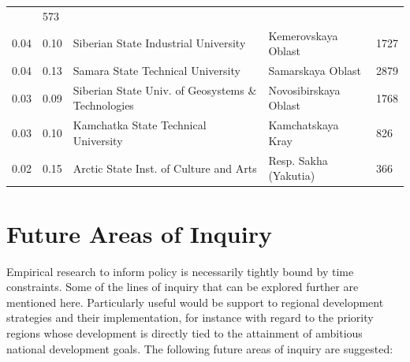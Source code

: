 \documentclass[alpha-refs]{wiley-article-04t}
\begin{document}
\begin{table}[htbp!]
\begin{tabular}{|p{.75cm}|p{.75cm}|p{7cm}|p{3cm}|R{1.25cm}|}
		& 573 \\ 
		0.04 & 0.10 & Siberian State Industrial University & Kemerovskaya 
		Oblast & 1727 \\ 
		0.04 & 0.13 & Samara State Technical University & Samarskaya Oblast 
		& 2879 \\ 
		0.03 & 0.09 & Siberian State Univ. of Geosystems \& Technologies & 
		Novosibirskaya Oblast & 1768 \\ 
		0.03 & 0.10 & Kamchatka State Technical University & Kamchatskaya 
		Kray & 826 \\ 
		0.02 & 0.15 & Arctic State Inst. of Culture and Arts & Resp. Sakha 
		(Yakutia) & 366 \\ 
		\hline
	\end{tabular}
\end{table}



\newpage

\section{Future Areas of Inquiry}



Empirical research to inform policy is necessarily tightly bound by time 
constraints. Some of the lines of inquiry that can be explored further are 
mentioned here. Particularly useful would be support to regional 
development strategies and their implementation, for instance with regard 
to the priority regions whose development is directly tied to the 
attainment of ambitious national development goals. The following future 
areas of inquiry are suggested:
\end{document}
